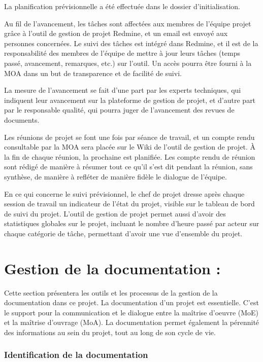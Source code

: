 \documentclass[a4paper, 18pt]{article}
\begin{document}
La planification prévisionnelle a été effectuée dans le dossier d'initialisation.

Au fil de l'avancement, les tâches sont affectées aux membres de l'équipe projet grâce à l'outil de gestion de projet Redmine, et un email est envoyé aux personnes concernées. Le suivi des tâches est intégré dans Redmine, et il est de la responsabilité des membres de l'équipe de mettre à jour leurs tâches (temps passé, avancement, remarques, etc.) sur l'outil. Un accès pourra être fourni à la MOA dans un but de transparence et de facilité de suivi.

La mesure de l'avancement se fait d'une part par les experts techniques, qui indiquent leur avancement sur la plateforme de gestion de projet, et d'autre part par le responsable qualité, qui pourra juger de l'avancement des revues de documents.

Les réunions de projet se font une fois par séance de travail, et un compte rendu consultable par la MOA sera placée sur le Wiki de l'outil de gestion de projet. À la fin de chaque réunion, la prochaine est planifiée. Les compte rendu de réunion sont rédigé de manière à résumer tout ce qu'il s'est dit pendant la réunion, sans synthèse, de manière à refléter de manière fidèle le dialogue de l'équipe.

En ce qui concerne le suivi prévisionnel, le chef de projet dresse après chaque session de travail un indicateur de l'état du projet, visible sur le tableau de bord de suivi du projet. L'outil de gestion de projet permet aussi d'avoir des statistiques globales sur le projet, incluant le nombre d'heure passé par acteur sur chaque catégorie de tâche, permettant d'avoir une vue d'ensemble du projet.

\part{Gestion de la documentation :}

Cette section présentera les outils et les processus de la gestion de la documentation dans ce projet. La documentation d'un projet est essentielle. C'est le support pour la communication et le dialogue entre la maîtrise d'oeuvre (MoE) et la maîtrise d'ouvrage (MoA). La documentation permet également la pérennité des informations au sein du projet, tout au long de son cycle de vie.

\section{Identification de la documentation}
\end{document}
